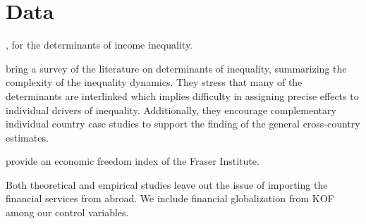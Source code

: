 \documentclass[a4paper,11pt]{article}
\begin{document}

%
%
%
%
%

\section{Data}
\cite{roineetal2009}, \citet{furceri2019robust} for the determinants of income inequality.

\citet{nolan2019drivers} bring a survey of the literature on determinants of inequality, summarizing the complexity of the inequality dynamics. They stress that many of the determinants are interlinked which implies difficulty in assigning precise effects to individual drivers of inequality. Additionally, they encourage complementary individual country case studies to support the finding of the general cross-country estimates.

\citet{gwartney2017} provide an economic freedom index of the Fraser Institute.

Both theoretical and empirical studies leave out the issue of importing the financial services from abroad. We include financial globalization from KOF among our control variables.



\end{document}
